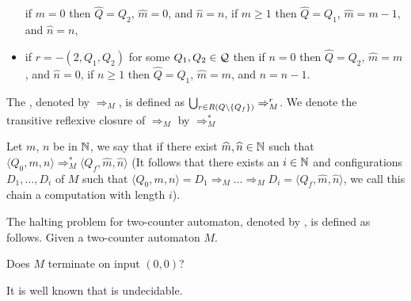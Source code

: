 \begin{definition}
\begin{itemize}
\subitem if $m=0$ then $\widehat{Q}=Q_2$, $\widehat{m}=0$, and $\widehat{n}=n$,
\subitem if $m\geq1$ then $\widehat{Q}=Q_1$, $\widehat{m}=m-1$, and $\widehat{n}=n$,
		\item if $r=-(2,Q_1,Q_2)$ for some $Q_1,Q_2\in \mathcal{Q}$ then
\subitem if $n=0$ then $\widehat{Q}=Q_2$, $\widehat{m}=m$, and $\widehat{n}=0$,
\subitem if $n\geq1$ then $\widehat{Q}=Q_1$, $\widehat{m}=m$, and $\widehat{n}=n-1$.
	\end{itemize}
	The , denoted by $\Rightarrow_M$, is defined as $\bigcup_{r\in R(Q\setminus\{Q_f\})}\Rightarrow^r_M$. We denote the transitive reflexive closure of $\Rightarrow_M$ by $\Rightarrow^*_M$
		
	Let $m$, $n$ be in $\mathbb{N}$, we say that  if there exist $\widehat{m},\widehat{n}\in\mathbb{N}$ such that $\langle Q_0,m,n\rangle\Rightarrow^*_M\langle Q_f,\widehat{m},\widehat{n}\rangle$ (It follows that there exists an $i\in\mathbb{N}$ and configurations $D_1,\dots,D_i$ of $M$ such that $\langle Q_0,m,n\rangle= D_1\Rightarrow_M\dots\Rightarrow_M D_i=\langle Q_f,\widehat{m},\widehat{n}\rangle$, we call this chain a computation with length $i$).
\end{definition}
\begin{definition}
	The halting problem for two-counter automaton, denoted by \autHalt{}, is defined as follows.
	Given a two-counter automaton $M$. 
	\begin{center}
		Does $M$ terminate on input $(0,0)$?
	\end{center}
\end{definition}
It is well known that \autHalt{} is undecidable. %

